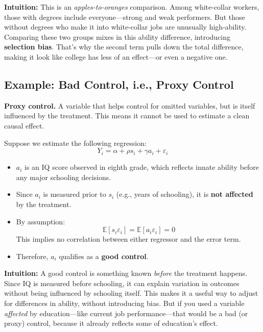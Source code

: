 \documentclass[12pt]{article}
\begin{document}
\textbf{Intuition:}  
This is an \textit{apples-to-oranges} comparison. Among white-collar workers, those with degrees include everyone—strong and weak performers. But those without degrees who make it into white-collar jobs are unusually high-ability. Comparing these two groups mixes in this ability difference, introducing \textbf{selection bias}. That’s why the second term pulls down the total difference, making it look like college has less of an effect—or even a negative one.

\subsection*{\noindent\textbf{Example: Bad Control, i.e., Proxy Control}}

\textbf{Proxy control.} A variable that helps control for omitted variables, but is itself influenced by the treatment. This means it cannot be used to estimate a clean causal effect.

Suppose we estimate the following regression:
\begin{equation}
Y_i = \alpha + \rho s_i + \gamma a_i + \varepsilon_i
\end{equation}

\begin{itemize}
  \item $a_i$ is an IQ score observed in eighth grade, which reflects innate ability before any major schooling decisions.
  
  \item Since $a_i$ is measured prior to $s_i$ (e.g., years of schooling), it is \textbf{not affected} by the treatment.
  
  \item By assumption:
  \[
  \mathbb{E}[s_i \varepsilon_i] = \mathbb{E}[a_i \varepsilon_i] = 0
  \]
  This implies no correlation between either regressor and the error term.
  
  \item Therefore, $a_i$ qualifies as a \textbf{good control}.
\end{itemize}

\textbf{Intuition:}  
A good control is something known \textit{before} the treatment happens. Since IQ is measured before schooling, it can explain variation in outcomes without being influenced by schooling itself. This makes it a useful way to adjust for differences in ability, without introducing bias. But if you used a variable \textit{affected} by education—like current job performance—that would be a bad (or proxy) control, because it already reflects some of education's effect.
\end{document}
